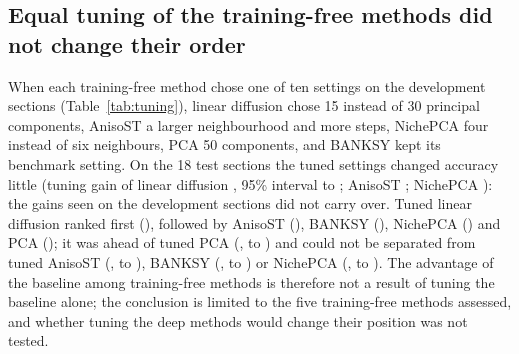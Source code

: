 \documentclass[unnumsec,webpdf,contemporary,large]{oup-authoring-template}
\begin{document}
\subsection{Equal tuning of the training-free methods did not change their order}
When each training-free method chose one of ten settings on the development sections (Table~\ref{tab:tuning}), linear diffusion chose 15
instead of 30 principal components, AnisoST a larger neighbourhood and more steps, NichePCA four instead of six neighbours, PCA 50
components, and BANKSY kept its benchmark setting. On the 18 test sections the tuned settings changed accuracy little (tuning gain of
linear diffusion \rvRfiveGainLin, 95\% interval \rvRfiveGainLinLo{} to \rvRfiveGainLinHi; AnisoST \rvRfiveGainAnisost; NichePCA
\rvRfiveGainNichepca): the gains seen on the development sections did not carry over. Tuned linear diffusion ranked first
(\rvRfiveTunedLin), followed by AnisoST (\rvRfiveTunedAnisost), BANKSY (\rvRfiveTunedBanksy), NichePCA (\rvRfiveTunedNichepca) and PCA
(\rvRfiveTunedPca); it was ahead of tuned PCA (\rvRfivePcaD, \rvRfivePcaLo{} to \rvRfivePcaHi) and could not be separated from tuned
AnisoST (\rvRfiveAnisostD, \rvRfiveAnisostLo{} to \rvRfiveAnisostHi), BANKSY (\rvRfiveBanksyD, \rvRfiveBanksyLo{} to \rvRfiveBanksyHi)
or NichePCA (\rvRfiveNichepcaD, \rvRfiveNichepcaLo{} to \rvRfiveNichepcaHi). The advantage of the baseline among training-free methods is
therefore not a result of tuning the baseline alone; the conclusion is limited to the five training-free methods assessed, and whether
tuning the deep methods would change their position was not tested.
\end{document}
